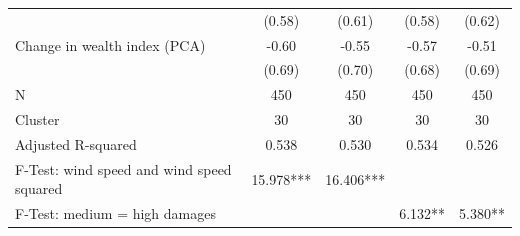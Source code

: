 {\begin{tabular}{l*{4}{c}}
                    &      (0.58)         &      (0.61)         &      (0.58)         &      (0.62)         \\
Change in wealth index (PCA)&       -0.60         &       -0.55         &       -0.57         &       -0.51         \\
                    &      (0.69)         &      (0.70)         &      (0.68)         &      (0.69)         \\
\midrule
N                   &         450         &         450         &         450         &         450         \\
Cluster             &          30         &          30         &          30         &          30         \\
Adjusted R-squared  &       0.538         &       0.530         &       0.534         &       0.526         \\
F-Test: wind speed and wind speed squared&   15.978***         &   16.406***         &                     &                     \\
F-Test: medium = high damages&                     &                     &     6.132**         &     5.380**         \\
\bottomrule
\end{tabular}
}
